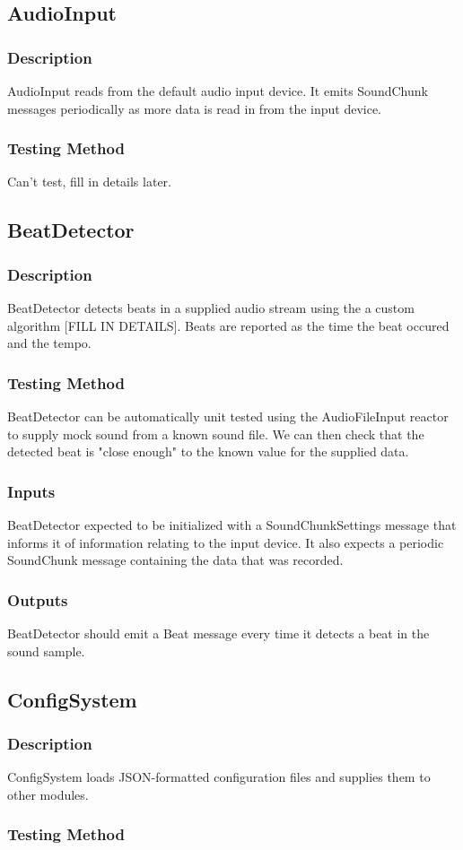 \documentclass[a4paper]{article}
\begin{document}
	\subsection{AudioInput}
		\subsubsection{Description}
			AudioInput reads from the default audio input device.
			It emits SoundChunk messages periodically as more data is read in from the input device.
		\subsubsection{Testing Method}
			Can't test, fill in details later.

	\subsection{BeatDetector}
		\subsubsection{Description}
			BeatDetector detects beats in a supplied audio stream using the a custom algorithm [FILL IN DETAILS].
			Beats are reported as the time the beat occured and the tempo.
		\subsubsection{Testing Method}
			BeatDetector can be automatically unit tested using the AudioFileInput reactor to supply mock sound from a known sound file. 
			We can then check that the detected beat is "close enough" to the known value for the supplied data.
		\subsubsection{Inputs}
			BeatDetector expected to be initialized with a SoundChunkSettings message that informs it of information relating to the input device.
			It also expects a periodic SoundChunk message containing the data that was recorded.
		\subsubsection{Outputs}
			BeatDetector should emit a Beat message every time it detects a beat in the sound sample.

	\subsection{ConfigSystem}
		\subsubsection{Description}
			ConfigSystem loads JSON-formatted configuration files and supplies them to other modules.
		\subsubsection{Testing Method}
			
		
\end{document}
